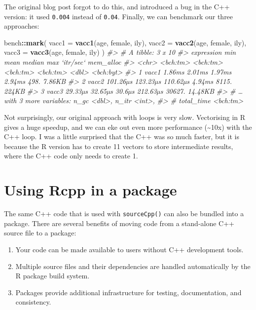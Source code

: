 \documentclass[]{book}
\newenvironment{Shaded}{\begin{snugshade}}{\end{snugshade}}
\newcommand{\CommentTok}[1]{\textcolor[rgb]{0.37,0.37,0.37}{\textit{#1}}}
\newcommand{\DataTypeTok}[1]{\textcolor[rgb]{0.27,0.27,0.27}{#1}}
\newcommand{\KeywordTok}[1]{\textcolor[rgb]{0.27,0.27,0.27}{\textbf{#1}}}
\newcommand{\NormalTok}[1]{#1}
\newcommand{\OperatorTok}[1]{\textcolor[rgb]{0.43,0.43,0.43}{\textbf{#1}}}
\begin{document}
The original blog post forgot to do this, and introduced a bug in the C++ version: it used \texttt{0.004} instead of \texttt{0.04}. Finally, we can benchmark our three approaches:

\begin{Shaded}
\begin{Highlighting}[]
\NormalTok{bench}\OperatorTok{::}\KeywordTok{mark}\NormalTok{(}
  \DataTypeTok{vacc1 =} \KeywordTok{vacc1}\NormalTok{(age, female, ily),}
  \DataTypeTok{vacc2 =} \KeywordTok{vacc2}\NormalTok{(age, female, ily),}
  \DataTypeTok{vacc3 =} \KeywordTok{vacc3}\NormalTok{(age, female, ily)}
\NormalTok{)}
\CommentTok{#> # A tibble: 3 x 10}
\CommentTok{#>   expression      min     mean   median      max `itr/sec` mem_alloc}
\CommentTok{#>   <chr>      <bch:tm> <bch:tm> <bch:tm> <bch:tm>     <dbl> <bch:byt>}
\CommentTok{#> 1 vacc1        1.86ms   2.01ms   1.97ms   2.94ms      498.    7.86KB}
\CommentTok{#> 2 vacc2      101.26µs 123.23µs 110.62µs   4.94ms     8115.     224KB}
\CommentTok{#> 3 vacc3       29.33µs  32.65µs   30.6µs 212.63µs    30627.   14.48KB}
\CommentTok{#> # … with 3 more variables: n_gc <dbl>, n_itr <int>,}
\CommentTok{#> #   total_time <bch:tm>}
\end{Highlighting}
\end{Shaded}

Not surprisingly, our original approach with loops is very slow. Vectorising in R gives a huge speedup, and we can eke out even more performance (\textasciitilde{}10x) with the C++ loop. I was a little surprised that the C++ was so much faster, but it is because the R version has to create 11 vectors to store intermediate results, where the C++ code only needs to create 1.

\hypertarget{rcpp-package}{%
\section{Using Rcpp in a package}\label{rcpp-package}}

The same C++ code that is used with \texttt{sourceCpp()} can also be bundled into a package. There are several benefits of moving code from a stand-alone C++ source file to a package: 

\begin{enumerate}
\def\labelenumi{\arabic{enumi}.}
\item
  Your code can be made available to users without C++ development tools.
\item
  Multiple source files and their dependencies are handled automatically by
  the R package build system.
\item
  Packages provide additional infrastructure for testing, documentation, and
  consistency.
\end{enumerate}
\end{document}
